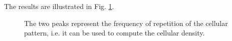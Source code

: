  The results are illustrated in Fig. \ref{fig:fourier:python:cornee}.\vspace*{-5pt}
 \begin{figure}[htbp]
 \centering\caption{The two peaks represent the frequency of repetition of the cellular pattern, i.e. it can be used to compute the cellular density.}%
  \hspace{1cm}
  \label{fig:fourier:python:cornee}\vspace*{-10pt}%
 \end{figure}
